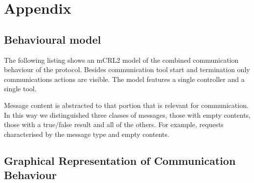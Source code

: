 \documentclass{article}
\begin{document}
%
%   

  \enlargethispage*{4pt}
  

  \appendix
  \section{Appendix}
  \pagestyle{empty}

  \subsection{Behavioural model}
   The following listing shows an mCRL2 model of the combined communication
   behaviour of the protocol. Besides communication tool start and termination
   only communications actions are visible. The model features a single
   controller and a single tool.

  \small  \normalsize
   Message content is abstracted to that portion that is relevant for
   communication. In this way we distinguished three classes of messages, those
   with empty contents, those with a true/false result and all of the others.
   For example, requests characterised by the message type and empty
   contents.

  \pagebreak

  \subsection{Graphical Representation of Communication Behaviour}
\end{document}
